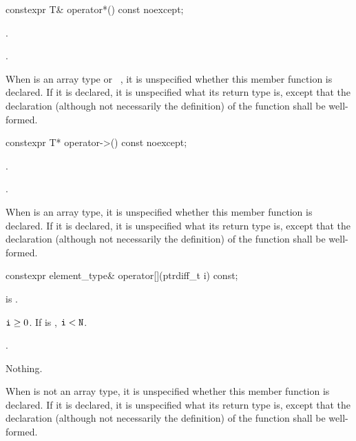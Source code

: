 %
\begin{itemdecl}
constexpr T& operator*() const noexcept;
\end{itemdecl}

\begin{itemdescr}
\pnum
\expects
{}.

\pnum
\returns
{}.

\pnum
\remarks
When  is an array type or \cv{}~,
it is unspecified whether this
member function is declared. If it is declared, it is unspecified what its
return type is, except that the declaration (although not necessarily the
definition) of the function shall be well-formed.
\end{itemdescr}

%
\begin{itemdecl}
constexpr T* operator->() const noexcept;
\end{itemdecl}

\begin{itemdescr}
\pnum
\expects
{}.

\pnum
\returns
{}.

\pnum
\remarks
When  is an array type,
it is unspecified whether this member function is declared.
If it is declared, it is unspecified what its return type is,
except that the declaration (although not necessarily the definition)
of the function shall be well-formed.
\end{itemdescr}

%
\begin{itemdecl}
constexpr element_type& operator[](ptrdiff_t i) const;
\end{itemdecl}

\begin{itemdescr}
\pnum
\expects
{} is .

\pnum
\hardexpects
$\tcode{i} \ge 0$. If  is , $\tcode{i} < \tcode{N}$.

\pnum
\returns
{}.

\pnum
\throws
Nothing.

\pnum
\remarks
When  is not an array type,
it is unspecified whether this member function is declared.
If it is declared, it is unspecified what its return type is,
except that the declaration (although not necessarily the definition)
of the function shall be well-formed.
\end{itemdescr}

